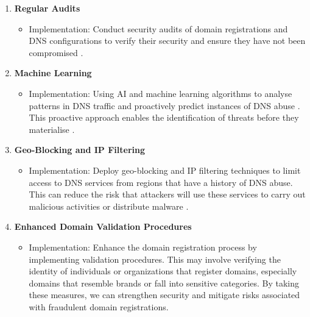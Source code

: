 \begin{enumerate}
\begin{itemize}
    \end{itemize}
    \item \textbf{Regular Audits}
    \begin{itemize}
        \item Implementation: Conduct security audits of domain registrations and DNS configurations to verify their security and ensure they have not been compromised \cite{coronado2014auditing}.
    \end{itemize}
    \item \textbf{Machine Learning}
    \begin{itemize}
        \item Implementation: Using AI and machine learning algorithms to analyse patterns in DNS traffic and proactively predict instances of DNS abuse \cite{icannndnssec}. This proactive approach enables the identification of threats before they materialise \cite{tsukerman2019machine}.
    \end{itemize}
    \item \textbf{Geo-Blocking and IP Filtering}
    \begin{itemize}
        \item Implementation: Deploy geo-blocking and IP filtering techniques to limit access to DNS services from regions that have a history of DNS abuse. This can reduce the risk that attackers will use these services to carry out malicious activities or distribute malware \cite{meeseedited}.
    \end{itemize}
    \item \textbf{Enhanced Domain Validation Procedures}
    \begin{itemize}
        \item Implementation: Enhance the domain registration process by implementing validation procedures. This may involve verifying the identity of individuals or organizations that register domains, especially domains that resemble brands or fall into sensitive categories. By taking these measures, we can strengthen security and mitigate risks associated with fraudulent domain registrations.
    \end{itemize}
\end{enumerate}


